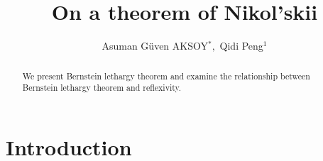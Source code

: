 \documentclass[12pt, reqno]{amsart}
\theoremstyle{definition}
\theoremstyle{remark}
\numberwithin{equation}{section}
\begin{document}
\setcounter{page}{1}

\title{On a theorem of Nikol'skii}

\author[A. AKSOY, Q. Peng]{Asuman G\"{u}ven AKSOY$^*, $ Qidi Peng$^1$}

\address{$^{*}$Department of Mathematics, Claremont McKenna College, 850 Columbia Avenue, Claremont, California  91711, USA.}
\email{\textcolor[rgb]{0.00,0.00,0.84}{aaksoy@cmc.edu}}
\address{$^{1}$Institute of Mathematical Sciences, Claremont Graduate University, 1237 N. Dartmouth Avenue, Claremont, California  91711, USA.}
\email{\textcolor[rgb]{0.00,0.00,0.84}{qidi.peng@cgu.edu}}





\begin{abstract}
We present Bernstein lethargy theorem  and  examine the relationship between  Bernstein lethargy theorem and reflexivity.

\end{abstract} \maketitle

\section{Introduction}
\end{document}
